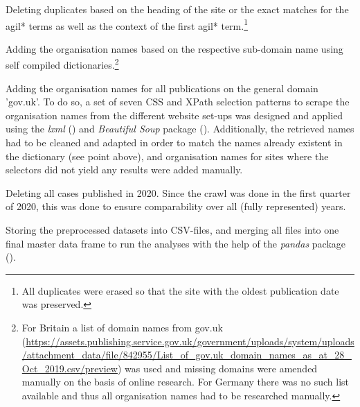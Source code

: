 \begin{compactitem}
\item Deleting duplicates based on the heading of the site or the exact matches for the agil* terms as well as the context of the first agil* term.\footnote{All duplicates were erased so that the site with the oldest publication date was preserved.}
\item Adding the organisation names based on the respective sub-domain name using self compiled dictionaries.\footnote{For Britain a list of domain names from gov.uk (\url{https://assets.publishing.service.gov.uk/government/uploads/system/uploads/attachment_data/file/842955/List_of_gov.uk_domain_names_as_at_28_Oct_2019.csv/preview}) was used and missing domains were amended manually on the basis of online research. For Germany there was no such list available and thus all organisation names had to be researched manually.} 
\item Adding the organisation names for all publications on the general domain 'gov.uk'. To do so, a set of seven CSS and XPath selection patterns to scrape the organisation names from the different website set-ups was designed and applied using the \textit{lxml} (\cite{Faassen2006}) and \textit{Beautiful Soup} package (\cite{Richardson2007}). Additionally, the retrieved names had to be cleaned and adapted in order to match the names already existent in the dictionary (see point above), and organisation names for sites where the selectors did not yield any results were added manually. 
\item Deleting all cases published in 2020. Since the crawl was done in the first quarter of 2020, this was done to ensure comparability over all (fully represented) years.
\item Storing the preprocessed datasets into CSV-files, and merging all files into one final master data frame to run the analyses with the help of the \textit{pandas} package (\cite{McKinney2010}). 
\end{compactitem}

